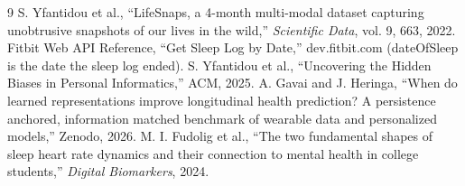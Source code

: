 \documentclass[11pt]{article}
\begin{document}
\vspace{-4pt}
\renewcommand{\refname}{\normalsize References}
\begin{thebibliography}{9}\small\setlength{\itemsep}{0pt}
 S. Yfantidou et al., ``LifeSnaps, a 4-month multi-modal dataset capturing unobtrusive snapshots of our lives in the wild,'' \emph{Scientific Data}, vol. 9, 663, 2022.
 Fitbit Web API Reference, ``Get Sleep Log by Date,'' dev.fitbit.com (dateOfSleep is the date the sleep log ended).
 S. Yfantidou et al., ``Uncovering the Hidden Biases in Personal Informatics,'' ACM, 2025.
 A. Gavai and J. Heringa, ``When do learned representations improve longitudinal health prediction? A persistence anchored, information matched benchmark of wearable data and personalized models,'' Zenodo, 2026.
 M. I. Fudolig et al., ``The two fundamental shapes of sleep heart rate dynamics and their connection to mental health in college students,'' \emph{Digital Biomarkers}, 2024.
\end{thebibliography}
\end{document}
